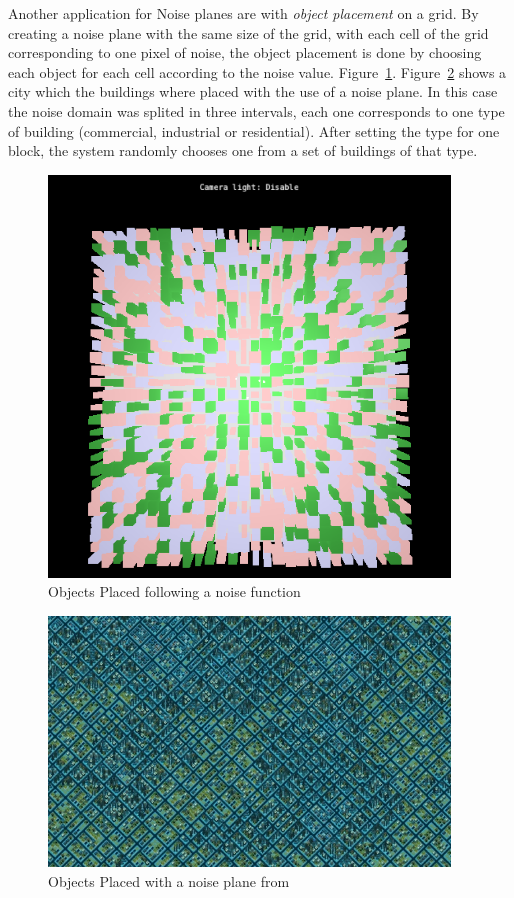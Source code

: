 Another application for Noise planes are with \emph{object placement} on a grid. By creating a noise plane with the same size of the grid, with each cell of the grid corresponding to one pixel of noise, the object placement is done by choosing each object for each cell according to the noise value. Figure~\ref{fig:MyNCity}.
Figure~\ref{fig:NCity} shows a city which the buildings where placed with the use of a noise plane. In this case the noise domain was splited in three intervals, each one corresponds to one type of building (commercial, industrial or residential). After setting the type for one block, the system randomly chooses one from a set of buildings of that type.

\begin{figure}[htbp]
    \centering
    \includegraphics[width=0.95\textwidth]{img/Theory/Perlin_Noise/AppletNoName201501191604.png}
    \caption{Objects Placed following a noise function}
    \label{fig:MyNCity}
\end{figure}

\begin{figure}[htbp]
	\centering
	\includegraphics[width=0.95\textwidth]{img/Theory/Perlin_Noise/NoisyCity.jpg}
	\caption{Objects Placed with a noise plane from \cite{NoisesGAMES}}
	\label{fig:NCity}
\end{figure}

